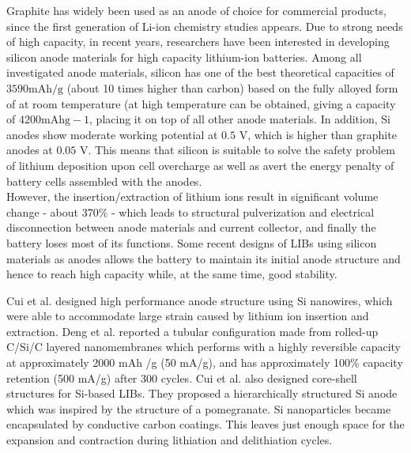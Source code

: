  Graphite has widely been used as an anode of choice for commercial products, since the first generation of Li-ion chemistry studies appears. Due to strong needs of high capacity, in recent years, researchers have been interested in developing silicon anode materials for high capacity lithium-ion batteries. Among all investigated anode materials, silicon has one of the best  theoretical capacities of $3590 \mathrm{mAh/g}$ (about 10 times higher than carbon) based on the fully alloyed form of  at room temperature (at high temperature  can be obtained, giving a capacity of $4200 \mathrm{mAh g−1}$, placing it on top of all other anode materials. In addition, Si anodes show moderate working potential at $0.5$ V, which is higher than graphite anodes at $0.05 $ V. This means that silicon is suitable to solve the safety problem of lithium deposition upon cell overcharge as well as avert the energy penalty of battery cells assembled with the  anodes.\\
 However, the insertion/extraction of lithium ions result in significant volume change - about 370\% - which leads to structural pulverization and electrical disconnection between anode materials and current collector, and finally the battery loses most of its functions. Some recent designs of LIBs using silicon materials as anodes allows the battery to maintain its initial anode structure and hence to reach high capacity while, at the same time, good stability. 

 Cui et al. designed high performance anode structure using Si nanowires, which were able to accommodate large strain caused by lithium ion insertion and extraction.\cite{Cui2009} 
 Deng et al. reported a tubular configuration made from rolled-up C/Si/C layered nanomembranes which performs with a highly reversible capacity at approximately 2000 mAh /g (50 mA/g), and has approximately 100\% capacity retention (500 mA/g) after 300 cycles.\cite{Deng2013}
 Cui et al. also designed core-shell structures for Si-based LIBs. They proposed a hierarchically structured Si anode which was inspired by the structure of a pomegranate. Si nanoparticles became encapsulated by conductive carbon coatings. This leaves just enough space for the expansion and contraction during lithiation and delithiation cycles. \cite{Liu2014d}
   
